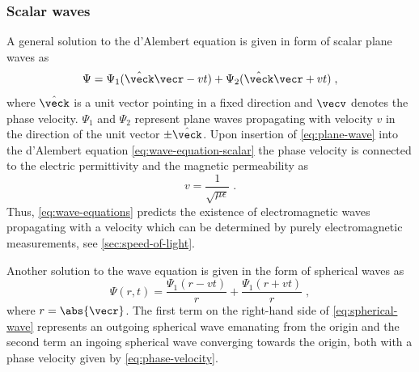 \documentclass[
twoside,
openright,
titlepage,
numbers=noenddot,
headinclude,
fleqn,
a4paper,
footinclude=true,
cleardoublepage=empty,
abstractoff,
BCOR=5mm,
paper=a4,
fontsize=11pt,
british,ngerman,american,
]{scrreprt}
\begin{document}
\subsubsection{Scalar waves}
\label{sec:scalar-waves}

A general solution to the  d'Alembert equation is given in form of
scalar plane waves as
\begin{equation}
  \label{eq:plane-wave}
  \Psi=\Psi_1(\hat{\veck}\vecr- v t)+\Psi_2(\hat{\veck}\vecr+ v t) \;,
\end{equation}
where $\hat{\veck}$ is a unit vector pointing in a fixed direction and
$\vecv$ denotes the phase velocity.  $\Psi_1$ and $\Psi_2$ represent
plane waves  propagating with velocity $v$ in the direction of the
unit vector $\pm\hat{\veck}$.  Upon insertion of \cref{eq:plane-wave}
into the d'Alembert equation \eqref{eq:wave-equation-scalar} the phase
velocity is connected to the electric permittivity and the magnetic
permeability as
\begin{equation}
  \label{eq:phase-velocity}
  v = \frac{1}{\sqrt{\mu\epsilon}}\;.
\end{equation}
Thus, \cref{eq:wave-equations} predicts the existence of
electromagnetic waves propagating with a velocity which can be
determined by purely electromagnetic measurements, see
\cref{sec:speed-of-light}.

Another solution to the wave equation is given in the form of
spherical waves as
\begin{equation}
  \label{eq:spherical-wave}
  \Psi(r,t) = \frac{\Psi_1(r-v t)}{r}+\frac{\Psi_1(r+v t)}{r}\;,
\end{equation}
where $r=\abs{\vecr}$.  The first term on the right-hand side of
\cref{eq:spherical-wave} represents an outgoing spherical wave
emanating from the origin and the second term an ingoing spherical
wave converging towards the origin, both with a phase velocity given
by \cref{eq:phase-velocity}.
\end{document}

